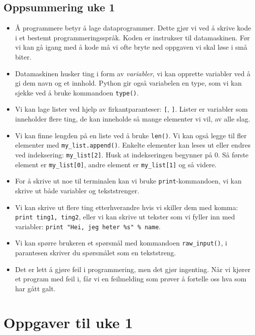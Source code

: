 \documentclass[a4paper, 11pt, notitlepage]{article}
\begin{document}
\subsection*{Oppsummering uke 1}

\begin{itemize}
	\item Å programmere betyr å lage dataprogrammer. Dette gjør vi ved å skrive kode i et bestemt programmeringsspråk. Koden er instrukser til datamaskinen. Før vi kan gå igang med å kode må vi ofte bryte ned oppgaven vi skal løse i små biter.
	\item Datamaskinen husker ting i form av \emph{variabler}, vi kan opprette variabler ved å gi dem navn og et innhold. Python gir også variabelen en type, som vi kan sjekke ved å bruke kommandoen \verb+type()+.
	\item Vi kan lage lister ved hjelp av firkantparanteser: \verb+[+, \verb+]+. Lister er variabler som inneholder flere ting, de kan inneholde så mange elementer vi vil, av alle slag.
	\item Vi kan finne lengden på en liste ved å bruke  \verb+len()+. Vi kan også legge til fler elementer med  \verb+my_list.append()+. Enkelte elementer kan leses ut eller endres ved  indeksering: \verb+my_list[2]+. Husk at indekseringen begynner på 0. Så første element er \verb+my_list[0]+, andre element er \verb+my_list[1]+ og så videre.
	\item For å skrive ut noe til terminalen kan vi bruke \verb+print+-kommandoen, vi kan skrive ut både variabler og tekststrenger.
	\item Vi kan skrive ut flere ting etterhverandre hvis vi skiller dem med komma: \verb+print ting1, ting2+, eller vi kan skrive ut tekster som vi fyller inn med variabler: \verb+print "Hei, jeg heter %s" % name+.
	\item Vi kan spørre brukeren et spørsmål med kommandoen \verb+raw_input()+, i parantesen skriver du spørsmålet som en tekststreng.
	\item Det er lett å gjøre feil i programmering, men det gjør ingenting. Når vi kjører et program med feil i, får vi en feilmelding som prøver å fortelle oss hva som har gått galt.
\end{itemize}

\clearpage

\section*{Oppgaver til uke 1}
\end{document}
